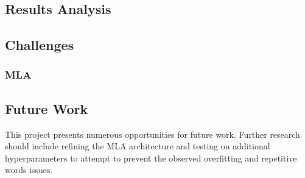 
\subsection{Results Analysis}

\subsection{Challenges}

\subsubsection{MLA}



\subsection{Future Work}
This project presents numerous opportunities for future work. 
Further research should include refining the MLA architecture and testing on additional hyperparameters to attempt to prevent the observed overfitting and repetitive words issues.